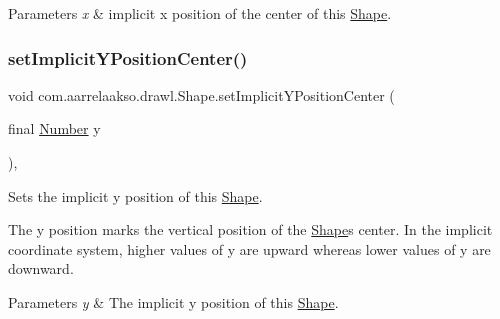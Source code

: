 \begin{DoxyParams}{Parameters}
{\em x} & implicit x position of the center of this \hyperlink{classcom_1_1aarrelaakso_1_1drawl_1_1_shape}{Shape}. \\
\hline
\end{DoxyParams}
\mbox{\label{classcom_1_1aarrelaakso_1_1drawl_1_1_shape_a79c79420c626b8b2d2534b6c9aa64d8f}} 
\subsubsection{\texorpdfstring{set\+Implicit\+Y\+Position\+Center()}{setImplicitYPositionCenter()}}
{\footnotesize\ttfamily void com.\+aarrelaakso.\+drawl.\+Shape.\+set\+Implicit\+Y\+Position\+Center (\begin{DoxyParamCaption}\item[{final \hyperlink{interfacecom_1_1aarrelaakso_1_1drawl_1_1_number}{Number}}]{y }\end{DoxyParamCaption})\hspace{0.3cm}{\ttfamily [protected]}, {\ttfamily [inherited]}}



Sets the implicit y position of this \hyperlink{classcom_1_1aarrelaakso_1_1drawl_1_1_shape}{Shape}. 

The y position marks the vertical position of the \hyperlink{classcom_1_1aarrelaakso_1_1drawl_1_1_shape}{Shape}\textquotesingle{}s center. In the implicit coordinate system, higher values of y are upward whereas lower values of y are downward.


\begin{DoxyParams}{Parameters}
{\em y} & The implicit y position of this \hyperlink{classcom_1_1aarrelaakso_1_1drawl_1_1_shape}{Shape}. \\
\hline
\end{DoxyParams}
\mbox{\label{classcom_1_1aarrelaakso_1_1drawl_1_1_shape_a0aef56392d76202235a9520394e87492}} 
